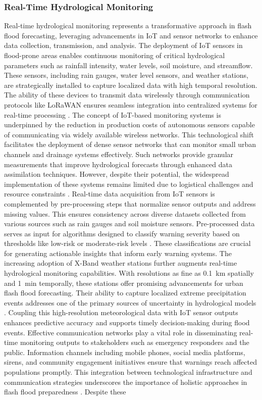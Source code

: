 \subsubsection{Real-Time Hydrological Monitoring}
Real-time hydrological monitoring represents a transformative approach in flash flood forecasting, leveraging advancements in IoT and sensor networks to enhance data collection, transmission, and analysis. The deployment of IoT sensors in flood-prone areas enables continuous monitoring of critical hydrological parameters such as rainfall intensity, water levels, soil moisture, and streamflow. These sensors, including rain gauges, water level sensors, and weather stations, are strategically installed to capture localized data with high temporal resolution. The ability of these devices to transmit data wirelessly through communication protocols like LoRaWAN ensures seamless integration into centralized systems for real-time processing \citep{Msigwa2024}. The concept of IoT-based monitoring systems is underpinned by the reduction in production costs of autonomous sensors capable of communicating via widely available wireless networks. This technological shift facilitates the deployment of dense sensor networks that can monitor small urban channels and drainage systems effectively. Such networks provide granular measurements that improve hydrological forecasts through enhanced data assimilation techniques. However, despite their potential, the widespread implementation of these systems remains limited due to logistical challenges and resource constraints \citep{Zanchetta2020}. Real-time data acquisition from IoT sensors is complemented by pre-processing steps that normalize sensor outputs and address missing values. This ensures consistency across diverse datasets collected from various sources such as rain gauges and soil moisture sensors. Pre-processed data serves as input for algorithms designed to classify warning severity based on thresholds like low-risk or moderate-risk levels \citep{Msigwa2024}. These classifications are crucial for generating actionable insights that inform early warning systems. The increasing adoption of X-Band weather stations further augments real-time hydrological monitoring capabilities. With resolutions as fine as \SI{0.1}{\kilo\meter} spatially and \SI{1}{\minute} temporally, these stations offer promising advancements for urban flash flood forecasting. Their ability to capture localized extreme precipitation events addresses one of the primary sources of uncertainty in hydrological models \citep{Zanchetta2020}. Coupling this high-resolution meteorological data with IoT sensor outputs enhances predictive accuracy and supports timely decision-making during flood events. Effective communication networks play a vital role in disseminating real-time monitoring outputs to stakeholders such as emergency responders and the public. Information channels including mobile phones, social media platforms, sirens, and community engagement initiatives ensure that warnings reach affected populations promptly. This integration between technological infrastructure and communication strategies underscores the importance of holistic approaches in flash flood preparedness \citep{Msigwa2024}. Despite these 